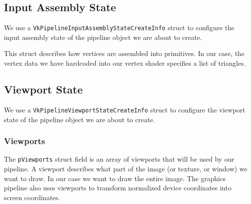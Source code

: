 \begin{minipage}{\linewidth}{\noindent}
    
\end{minipage}

\subsection{Input Assembly State}

We use a \texttt{VkPipelineInputAssemblyStateCreateInfo} struct to configure the
input assembly state of the pipeline object we are about to create.

This struct describes how vertices are assembled into primitives.
In our case, the vertex data we have hardcoded into our vertex shader specifies
a list of triangles.

\begin{minipage}{\linewidth}{\noindent}
    
\end{minipage}

\subsection{Viewport State}

We use a \texttt{VkPipelineViewportStateCreateInfo} struct to configure
the viewport state of the pipeline object we are about to create.

\begin{minipage}{\linewidth}{\noindent}
    
\end{minipage}

\subsubsection{Viewports}

The \texttt{pViewports} struct field
is an array of viewports that will be used by our pipeline.
A viewport describes what part of the image (or texture, or window) we want to draw.
In our case we want to draw the entire image.
The graphics pipeline also uses viewports to transform normalized device
coordinates into screen coordinates.


